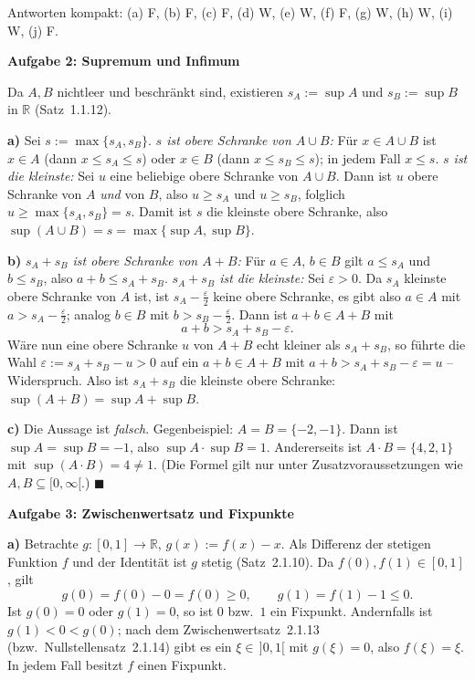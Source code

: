 \documentclass[a4paper,12pt]{article}
\providecommand{\qed}{\hfill\ensuremath{\blacksquare}}
\newcommand{\aufgabe}[2]{%
  \bigskip\par\noindent\textbf{Aufgabe #1: #2}\par\nobreak\medskip}
\begin{document}
\medskip
\noindent Antworten kompakt: (a) F, (b) F, (c) F, (d) W, (e) W, (f) F, (g) W, (h) W, (i) W, (j) F.

\aufgabe{2}{Supremum und Infimum}

Da $A,B$ nichtleer und beschränkt sind, existieren $s_A:=\sup A$ und $s_B:=\sup B$ in $\mathbb{R}$ (Satz~1.1.12).

\textbf{a)} Sei $s:=\max\{s_A,s_B\}$. \emph{$s$ ist obere Schranke von $A\cup B$:} Für $x\in A\cup B$ ist $x\in A$ (dann $x\le s_A\le s$) oder $x\in B$ (dann $x\le s_B\le s$); in jedem Fall $x\le s$. \emph{$s$ ist die kleinste:} Sei $u$ eine beliebige obere Schranke von $A\cup B$. Dann ist $u$ obere Schranke von $A$ \emph{und} von $B$, also $u\ge s_A$ und $u\ge s_B$, folglich $u\ge\max\{s_A,s_B\}=s$. Damit ist $s$ die kleinste obere Schranke, also $\sup(A\cup B)=s=\max\{\sup A,\sup B\}$.

\textbf{b)} \emph{$s_A+s_B$ ist obere Schranke von $A+B$:} Für $a\in A$, $b\in B$ gilt $a\le s_A$ und $b\le s_B$, also $a+b\le s_A+s_B$. \emph{$s_A+s_B$ ist die kleinste:} Sei $\varepsilon>0$. Da $s_A$ kleinste obere Schranke von $A$ ist, ist $s_A-\tfrac{\varepsilon}{2}$ keine obere Schranke, es gibt also $a\in A$ mit $a>s_A-\tfrac{\varepsilon}{2}$; analog $b\in B$ mit $b>s_B-\tfrac{\varepsilon}{2}$. Dann ist $a+b\in A+B$ mit
\[ a+b> s_A+s_B-\varepsilon. \]
Wäre nun eine obere Schranke $u$ von $A+B$ echt kleiner als $s_A+s_B$, so führte die Wahl $\varepsilon:=s_A+s_B-u>0$ auf ein $a+b\in A+B$ mit $a+b>s_A+s_B-\varepsilon=u$ -- Widerspruch. Also ist $s_A+s_B$ die kleinste obere Schranke: $\sup(A+B)=\sup A+\sup B$.

\textbf{c)} Die Aussage ist \emph{falsch}. Gegenbeispiel: $A=B=\{-2,-1\}$. Dann ist $\sup A=\sup B=-1$, also $\sup A\cdot\sup B=1$. Andererseits ist $A\cdot B=\{4,2,1\}$ mit $\sup(A\cdot B)=4\neq 1$. (Die Formel gilt nur unter Zusatzvoraussetzungen wie $A,B\subseteq[0,\infty[$.) \qed

\aufgabe{3}{Zwischenwertsatz und Fixpunkte}

\textbf{a)} Betrachte $g:[0,1]\to\mathbb{R}$, $g(x):=f(x)-x$. Als Differenz der stetigen Funktion $f$ und der Identität ist $g$ stetig (Satz~2.1.10). Da $f(0),f(1)\in[0,1]$, gilt
\[ g(0)=f(0)-0=f(0)\ge 0,\qquad g(1)=f(1)-1\le 0. \]
Ist $g(0)=0$ oder $g(1)=0$, so ist $0$ bzw.\ $1$ ein Fixpunkt. Andernfalls ist $g(1)<0<g(0)$; nach dem Zwischenwertsatz~2.1.13 (bzw.\ Nullstellensatz~2.1.14) gibt es ein $\xi\in\,]0,1[$ mit $g(\xi)=0$, also $f(\xi)=\xi$. In jedem Fall besitzt $f$ einen Fixpunkt.
\end{document}

